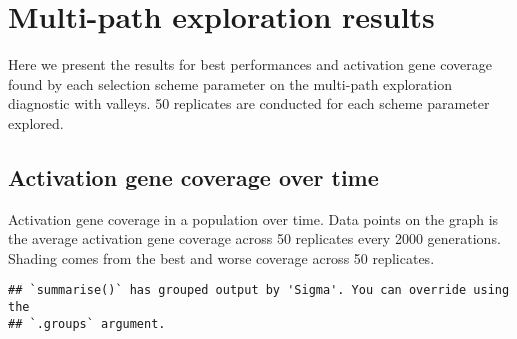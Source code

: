 \documentclass[]{book}
\newenvironment{Shaded}{\begin{snugshade}}{\end{snugshade}}
\newcommand{\DataTypeTok}[1]{\textcolor[rgb]{0.13,0.29,0.53}{#1}}
\newcommand{\KeywordTok}[1]{\textcolor[rgb]{0.13,0.29,0.53}{\textbf{#1}}}
\newcommand{\NormalTok}[1]{#1}
\newcommand{\OperatorTok}[1]{\textcolor[rgb]{0.81,0.36,0.00}{\textbf{#1}}}
\newcommand{\StringTok}[1]{\textcolor[rgb]{0.31,0.60,0.02}{#1}}
\begin{document}
\hypertarget{multi-path-exploration-results-4}{%
\section{Multi-path exploration results}\label{multi-path-exploration-results-4}}

Here we present the results for best performances and activation gene coverage found by each selection scheme parameter on the multi-path exploration diagnostic with valleys.
50 replicates are conducted for each scheme parameter explored.

\hypertarget{activation-gene-coverage-over-time-9}{%
\subsection{Activation gene coverage over time}\label{activation-gene-coverage-over-time-9}}

Activation gene coverage in a population over time.
Data points on the graph is the average activation gene coverage across 50 replicates every 2000 generations.
Shading comes from the best and worse coverage across 50 replicates.

\begin{Shaded}
\end{Shaded}

\begin{verbatim}
## `summarise()` has grouped output by 'Sigma'. You can override using the
## `.groups` argument.
\end{verbatim}
\end{document}
